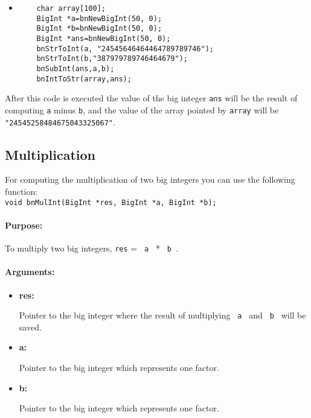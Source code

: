 \documentclass{book}
\begin{document}
\begin{itemize}
\item
\begin{verbatim}
    char array[100];
    BigInt *a=bnNewBigInt(50, 0);
    BigInt *b=bnNewBigInt(50, 0);
    BigInt *ans=bnNewBigInt(50, 0);
    bnStrToInt(a, "24545646464464789789746");
    bnStrToInt(b,"387979789746464679");
    bnSubInt(ans,a,b);
    bnIntToStr(array,ans);
\end{verbatim}
\end{itemize}

After this code is executed the value of the big integer \verb+ans+ will be the result of computing \verb+a+ minus \verb+b+, and the value of the array pointed by \verb+array+ will be \verb+"24545258484675043325067"+.

\subsection{Multiplication}

For computing the multiplication of two big integers you can use the following function:\\

\verb+void bnMulInt(BigInt *res, BigInt *a, BigInt *b);+\\

\paragraph{Purpose:} 

To multiply two big integers, \verb+res+ = \verb+ a + * \verb+ b +.

\paragraph{Arguments:}

\begin{itemize}
\item{\bf res:}

Pointer to the big integer where the result of multiplying \verb+ a + and \verb+ b + will be saved.

\item {\bf a:}

Pointer to the big integer which represents one factor. 

\item {\bf b:}

Pointer to the big integer which represents one factor. 

\end{itemize}
\end{document}
